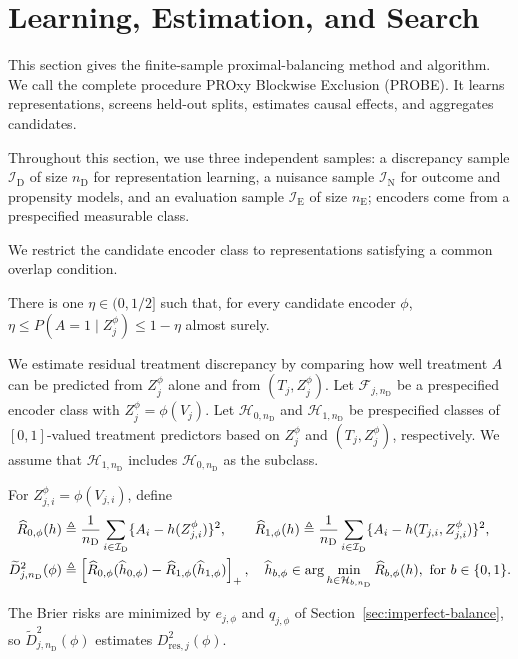\section{Learning, Estimation, and Search}
\label{sec:learning-search}
\label{sec:estimation}

This section gives the finite-sample proximal-balancing method and algorithm. We call the complete procedure PROxy Blockwise Exclusion (PROBE). It learns representations, screens held-out splits, estimates causal effects, and aggregates candidates.

Throughout this section, we use three independent samples: a discrepancy sample $\mathcal I_{\mathrm D}$ of size $n_{\mathrm D}$ for representation learning, a nuisance sample $\mathcal I_{\mathrm N}$ for outcome and propensity models, and an evaluation sample $\mathcal I_{\mathrm E}$ of size $n_{\mathrm E}$; encoders come from a prespecified measurable class.

We restrict the candidate encoder class to representations satisfying a common overlap condition.

\begin{assumption}
\label{ass:library-overlap}
There is one $\eta\in(0,1/2]$ such that, for every candidate encoder $\phi$, $\eta\le P(A=1\mid Z_j^\phi)\le1-\eta$ almost surely.
\end{assumption}

We estimate residual treatment discrepancy by comparing how well treatment $A$ can be predicted from $Z_j^\phi$ alone and from $(T_j,Z_j^\phi)$. Let $\mathcal F_{j,n_{\mathrm D}}$ be a prespecified encoder class with $Z_j^\phi=\phi(V_j)$. Let $\mathcal H_{0,n_{\mathrm D}}$ and $\mathcal H_{1,n_{\mathrm D}}$ be prespecified classes of $[0,1]$-valued treatment predictors based on $Z_j^\phi$ and $(T_j,Z_j^\phi)$, respectively. We assume that $\mathcal H_{1,n_{\mathrm D}}$ includes $\mathcal H_{0,n_{\mathrm D}}$ as the subclass.

\begin{definition}
\label{def:empirical-held-out-proxy-discrepancy}
	For $Z_{j,i}^\phi=\phi(V_{j,i})$, define
	\begin{align}
		\widehat R_{0,\phi}(h) &\triangleq \frac{1}{n_{\mathrm D}} \sum_{i\in\mathcal I_{\mathrm D}} \{A_i-h(Z_{j,i}^\phi)\}^2, \qquad \widehat R_{1,\phi}(h) \triangleq \frac{1}{n_{\mathrm D}} \sum_{i\in\mathcal I_{\mathrm D}} \{A_i-h(T_{j,i},Z_{j,i}^\phi)\}^2, \notag\\
		\widetilde D_{j,n_{\mathrm D}}^2(\phi) &\triangleq \left[ \widehat R_{0,\phi}(\widehat h_{0,\phi}) - \widehat R_{1,\phi}(\widehat h_{1,\phi}) \right]_+ \label{eq:empirical-brier-fitting}, \quad \widehat h_{b,\phi}\in\arg\min_{h\in\mathcal H_{b,n_{\mathrm D}}}\widehat R_{b,\phi}(h), \text{ for }b\in\{0,1\}.
	\end{align}
	
\end{definition}
 The Brier risks are minimized by $e_{j,\phi}$ and $q_{j,\phi}$ of Section~\ref{sec:imperfect-balance}, so $\widetilde D_{j,n_{\mathrm D}}^2(\phi)$ estimates $D_{\mathrm{res},j}^2(\phi)$.

